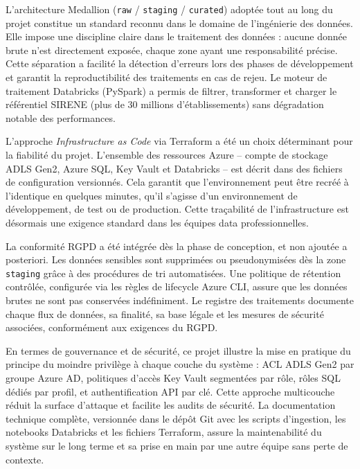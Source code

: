 \documentclass[12pt,a4paper]{article}
\begin{document}
L'architecture Medallion (\texttt{raw} / \texttt{staging} / \texttt{curated}) adoptée tout au long du projet constitue un standard reconnu dans le domaine de l'ingénierie des données. Elle impose une discipline claire dans le traitement des données : aucune donnée brute n'est directement exposée, chaque zone ayant une responsabilité précise. Cette séparation a facilité la détection d'erreurs lors des phases de développement et garantit la reproductibilité des traitements en cas de rejeu. Le moteur de traitement Databricks (PySpark) a permis de filtrer, transformer et charger le référentiel SIRENE (plus de 30 millions d'établissements) sans dégradation notable des performances.

L'approche \textit{Infrastructure as Code} via Terraform a été un choix déterminant pour la fiabilité du projet. L'ensemble des ressources Azure -- compte de stockage ADLS Gen2, Azure SQL, Key Vault et Databricks -- est décrit dans des fichiers de configuration versionnés. Cela garantit que l'environnement peut être recréé à l'identique en quelques minutes, qu'il s'agisse d'un environnement de développement, de test ou de production. Cette traçabilité de l'infrastructure est désormais une exigence standard dans les équipes data professionnelles.

La conformité RGPD a été intégrée dès la phase de conception, et non ajoutée a posteriori. Les données sensibles sont supprimées ou pseudonymisées dès la zone \texttt{staging} grâce à des procédures de tri automatisées. Une politique de rétention contrôlée, configurée via les règles de lifecycle Azure CLI, assure que les données brutes ne sont pas conservées indéfiniment. Le registre des traitements documente chaque flux de données, sa finalité, sa base légale et les mesures de sécurité associées, conformément aux exigences du RGPD.

En termes de gouvernance et de sécurité, ce projet illustre la mise en pratique du principe du moindre privilège à chaque couche du système : ACL ADLS Gen2 par groupe Azure AD, politiques d'accès Key Vault segmentées par rôle, rôles SQL dédiés par profil, et authentification API par clé. Cette approche multicouche réduit la surface d'attaque et facilite les audits de sécurité. La documentation technique complète, versionnée dans le dépôt Git avec les scripts d'ingestion, les notebooks Databricks et les fichiers Terraform, assure la maintenabilité du système sur le long terme et sa prise en main par une autre équipe sans perte de contexte.

\newpage
\appendix
\renewcommand{\thesection}{\Alph{section}}
\end{document}
